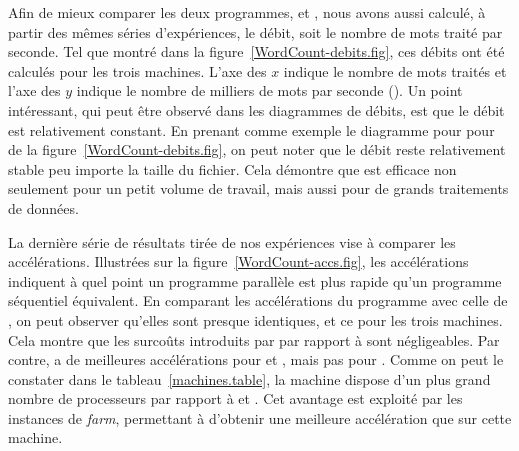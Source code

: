 Afin de mieux comparer les deux programmes,  et , nous avons aussi calculé, à partir des mêmes séries d'exp\'eriences, le d\'ebit, soit le nombre de mots trait\'e par seconde. Tel que montr\'e dans la figure~\ref{WordCount-debits.fig}, ces débits ont \'et\'e calculés pour les trois machines. L'axe des $x$ indique le nombre de mots trait\'es et l'axe des $y$ indique le nombre de milliers de mots par seconde (). Un point int\'eressant, qui peut \^etre observ\'e dans les diagrammes de d\'ebits, est que le d\'ebit est relativement constant. En prenant comme exemple le diagramme pour  pour  de la figure~\ref{WordCount-debits.fig}, on peut noter que le d\'ebit reste relativement stable peu importe la taille du fichier. Cela d\'emontre que  est efficace non seulement pour un petit volume de travail, mais aussi pour de grands traitements de donn\'ees.


La derni\`ere s\'erie de résultats tirée de nos exp\'eriences vise \`a comparer les acc\'el\'erations. Illustr\'ees sur la figure~\ref{WordCount-accs.fig}, les acc\'el\'erations indiquent \`a quel point un programme parall\`ele est plus rapide qu'un programme s\'equentiel \'equivalent. En comparant les acc\'el\'erations du programme  avec celle de , on peut observer qu'elles sont presque identiques, et ce pour les trois machines. Cela montre que les surco\^uts introduits par  par rapport \`a  sont n\'egligeables. Par contre,  a de meilleures acc\'el\'erations pour  et , mais pas pour . Comme on peut le constater dans le tableau~\ref{machines.table}, la machine  dispose d'un plus grand nombre de processeurs par rapport \`a  et . Cet avantage est exploit\'e par les instances de \emph{farm}, permettant \`a  d'obtenir une meilleure acc\'el\'eration que  sur cette machine.




